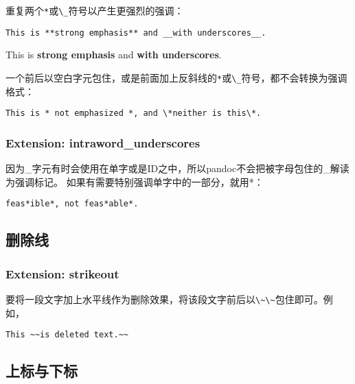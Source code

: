 \documentclass[cn]{elegantbook}
\newcommand{\passthrough}[1]{#1}
\begin{document}
重复两个\passthrough{\lstinline!*!}或\passthrough{\lstinline!\_!}符号以产生更强烈的强调：

\begin{lstlisting}
This is **strong emphasis** and __with underscores__.
\end{lstlisting}

This is \textbf{strong emphasis} and \textbf{with underscores}.

一个前后以空白字元包住，或是前面加上反斜线的\passthrough{\lstinline!*!}或\passthrough{\lstinline!\_!}符号，都不会转换为强调格式：

\begin{lstlisting}
This is * not emphasized *, and \*neither is this\*.
\end{lstlisting}

\hypertarget{extension-intraword_underscores}{%
\subsubsection{Extension:
intraword\_underscores}\label{extension-intraword_underscores}}

因为\_字元有时会使用在单字或是ID之中，所以pandoc不会把被字母包住的\_解读为强调标记。
如果有需要特别强调单字中的一部分，就用*：

\begin{lstlisting}
feas*ible*, not feas*able*.
\end{lstlisting}

\hypertarget{ux5220ux9664ux7ebf}{%
\subsection{删除线}\label{ux5220ux9664ux7ebf}}

\hypertarget{extension-strikeout}{%
\subsubsection{Extension: strikeout}\label{extension-strikeout}}

要将一段文字加上水平线作为删除效果，将该段文字前后以\passthrough{\lstinline!\~\~!}包住即可。例如，

\begin{lstlisting}
This ~~is deleted text.~~
\end{lstlisting}

\hypertarget{ux4e0aux6807ux4e0eux4e0bux6807}{%
\subsection{上标与下标}\label{ux4e0aux6807ux4e0eux4e0bux6807}}
\end{document}
